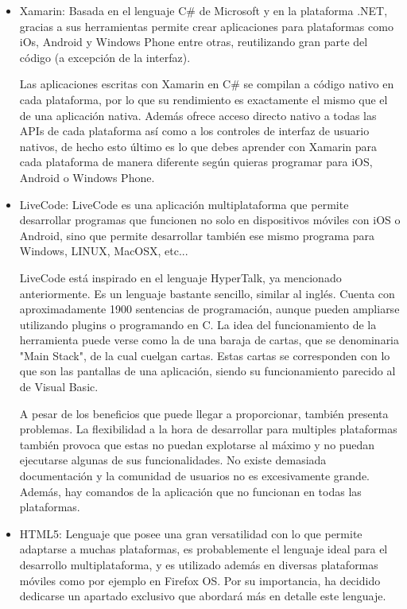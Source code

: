 \documentclass[
10pt, %
a4paper, %
oneside, %
headinclude,footinclude, %
BCOR5mm, %
]{scrartcl}
\begin{document}
\begin{itemize}
	\item Xamarin: Basada en el lenguaje C\# de Microsoft y en la plataforma .NET, gracias a sus herramientas permite crear aplicaciones para plataformas como iOs, Android y Windows Phone entre otras, reutilizando gran parte del código (a excepción de la interfaz).

	Las aplicaciones escritas con Xamarin en C\# se compilan a código nativo en cada plataforma, por lo que su rendimiento es exactamente el mismo que el de una aplicación nativa. Además ofrece acceso directo nativo a todas las APIs de cada plataforma así como a los controles de interfaz de usuario nativos, de hecho esto último es lo que debes aprender con Xamarin para cada plataforma de manera diferente según quieras programar para iOS, Android o Windows Phone.

	\item LiveCode: LiveCode es una aplicación multiplataforma que permite desarrollar programas que funcionen no solo en dispositivos móviles con iOS o Android, sino que permite desarrollar también ese mismo programa para Windows, LINUX, MacOSX, etc...

	LiveCode está inspirado en el lenguaje HyperTalk, ya mencionado anteriormente. Es un lenguaje bastante sencillo, similar al inglés. Cuenta con aproximadamente 1900 sentencias de programación, aunque pueden ampliarse utilizando plugins o programando en C. La idea del funcionamiento de la herramienta puede verse como la de una baraja de cartas, que se denominaria "Main Stack", de la cual cuelgan cartas. Estas cartas se corresponden con lo que son las pantallas de una aplicación, siendo su funcionamiento parecido al de Visual Basic.

	A pesar de los beneficios que puede llegar a proporcionar, también presenta problemas. La flexibilidad a la hora de desarrollar para multiples plataformas también provoca que estas no puedan explotarse al máximo y no puedan ejecutarse algunas de sus funcionalidades. No existe demasiada documentación y la comunidad de usuarios no es excesivamente grande. Además, hay comandos de la aplicación que no funcionan en todas las plataformas.

	\item HTML5: Lenguaje que posee una gran versatilidad con lo que permite adaptarse a muchas plataformas, es probablemente el lenguaje ideal para el desarrollo multiplataforma, y es utilizado además en diversas plataformas móviles como por ejemplo en Firefox OS. Por su importancia, ha decidido dedicarse un apartado exclusivo que abordará más en detalle este lenguaje.


\end{itemize}
\end{document}
